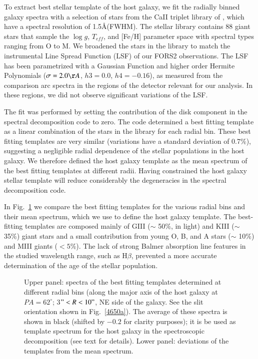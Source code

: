 \documentclass{aa}
\begin{document}
To extract best stellar template of the host galaxy, we fit the
radially binned galaxy spectra with a selection of stars from the
Ca{\small II} triplet library of \citet{Cenarro+01}, which have a
spectral resolution of 1.5\AA (FWHM). The stellar library contains 88
giant stars that sample the $\log g$, $T_{eff}$, and [Fe/H] parameter
space with spectral types ranging from O to M.  We broadened the
stars in the library to match the instrumental Line Spread Function
(LSF) of our FORS2 observations. The LSF has been parametrized with a
Gaussian Function and higher order Hermite Polynomials ($\sigma=2.0
\AA$, $h3=0.0$, $h4=-0.16$), as measured from the comparison arc
spectra in the regions of the detector relevant for our analysis. In
these regions, we did not observe significant variations of the LSF.

The fit was performed by setting the contribution of the disk
component in the spectral decomposition code to zero. The code
determined a best fitting template as a linear combination of the stars
in the library for each radial bin. These best fitting templates are
very similar (variations have a standard deviation of 0.7\%),
suggesting a negligible radial dependence of the stellar populations
in the host galaxy.  We therefore defined the host galaxy template as
the mean spectrum of the best fitting templates at different
radii. Having constrained the host galaxy stellar template will reduce
considerably the degeneracies in the spectral decomposition code.

In Fig.~\ref{fig:galaxy_templates} we compare the best fitting
templates for the various radial bins and their mean spectrum, which
we use to define the host galaxy template.  The best-fitting templates
are composed mainly of GIII ($\sim$ 50\%, in light) and KIII ($\sim$
35\%) giant stars and a small contribution from young O, B, and A
stars ($\sim$ 10\%) and MIII giants ($< 5$\%).  The lack of strong
Balmer absorption line features in the studied wavelength range, such
as H$\beta$, prevented a more accurate determination of the age of the
stellar population.





\begin{figure}
  \caption{Upper panel: spectra of the best fitting templates
    determined at different radial bins (along the major axis of the
    host galaxy at $PA=62^{\circ}$;  3$"<R<10"$, NE side of the
    galaxy. See the slit orientation shown in Fig.~\ref{4650a}). The
    average of these spectra is shown in black (shifted by $-0.2$ for
    clarity purposes); it is be used as template spectrum for the
    host galaxy in the spectroscopic decomposition (see text for
    details). Lower panel: deviations of the templates from the mean
    spectrum.}
\label{fig:galaxy_templates}
\end{figure}
\end{document}
